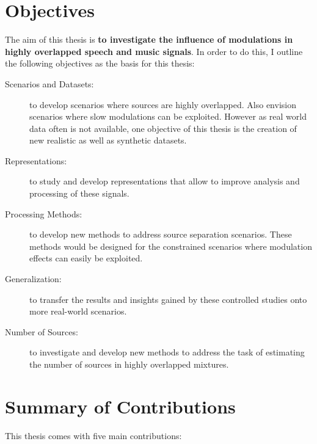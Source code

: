 \section{Objectives}

The aim of this thesis is \textbf{to investigate the influence of modulations in highly overlapped speech and music signals}.
In order to do this, I outline the following objectives as the basis for this thesis:

\begin{description}
  \item[Scenarios and Datasets:] to develop scenarios where sources are highly overlapped. Also envision scenarios where slow modulations can be exploited. 
  However as real world data often is not available, one objective of this thesis is the creation of new realistic as well as synthetic datasets.
  \item[Representations:] to study and develop representations that allow to improve analysis and processing of these signals.
  \item[Processing Methods:] to develop new methods to address source separation scenarios. These methods would be designed for the constrained scenarios where modulation effects can easily be exploited.
  \item[Generalization:] to transfer the results and insights gained by these controlled studies onto more real-world scenarios.
  \item[Number of Sources:] to investigate and develop new methods to address the task of estimating the number of sources in highly overlapped mixtures.
\end{description}


\clearpage
\section{Summary of Contributions}

This thesis comes with five main contributions:

